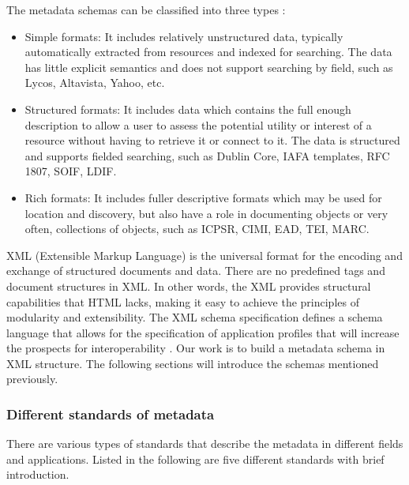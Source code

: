 The metadata schemas can be classified into three types \cite{dempsey1997specification}:
\begin{itemize}
	\item Simple formats: It includes relatively unstructured data, typically automatically extracted from resources and indexed for searching. 
	The data has little explicit semantics and does not support searching by field, such as Lycos, Altavista, Yahoo, etc.
	\item Structured formats: It includes data which contains the full enough description to allow a user to assess the potential utility or interest of a resource without having to retrieve it or connect to it. 
	The data is structured and supports fielded searching, such as Dublin Core, IAFA templates, RFC 1807, SOIF, LDIF.
	\item Rich formats: It includes fuller descriptive formats which may be used for location and discovery, 
	but also have a role in documenting objects or very often, collections of objects, such as ICPSR, CIMI, EAD, TEI, MARC.
\end{itemize}

XML (Extensible Markup Language) is the universal format for the encoding and exchange of structured documents and data. 
There are no predefined tags and document structures in XML. 
In other words, the XML provides structural capabilities that HTML lacks, making it easy to achieve the principles of modularity and extensibility. 
The XML schema specification defines a schema language that allows for the specification of application profiles that will increase the prospects for interoperability \cite{duval2002metadata}. 
Our work is to build a metadata schema in XML structure. The following sections will introduce the schemas mentioned previously.


\subsubsection*{Different standards of metadata}
\label{sec:mets}
There are various types of standards that describe the metadata in different fields and applications. 
Listed in the following are five different standards with brief introduction.

